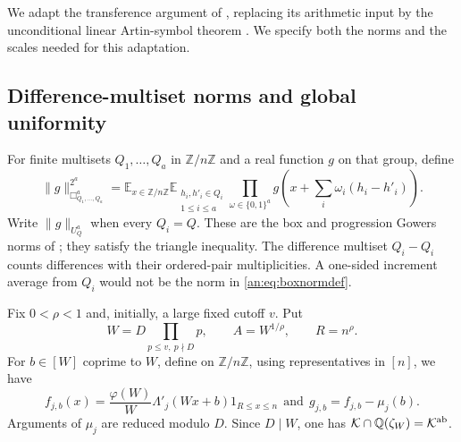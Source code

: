 \documentclass[11pt,reqno]{amsart}
\theoremstyle{definition}
\numberwithin{equation}{section}
\newcommand{\Lam}{\Lambda'}
\newcommand{\Q}{\mathbb Q}
\newcommand{\Z}{\mathbb Z}
\def\t{\text}
\begin{document}
We adapt the transference argument of \cite{TZpoly}, replacing its arithmetic input by the unconditional linear Artin-symbol theorem \cite[Theorem 1.4]{FT}. We specify both the norms and the scales needed for this adaptation.

\subsection{Difference-multiset norms and global uniformity}
For finite multisets $Q_1,\ldots,Q_a$ in $\Z/n\Z$ and a real function $g$ on that group, define
\begin{equation}\label{an:eq:boxnormdef}
 \|g\|_{\Box^a_{Q_1,\ldots,Q_a}}^{2^a}
 =\mathbb E_{x\in\Z/n\Z}
   \mathbb E_{\substack{h_i,h'_i\in Q_i\\1\le i\le a}}
   \prod_{\omega\in\{0,1\}^a}
       g\left(x+\sum_i\omega_i(h_i-h'_i)\right).
\end{equation}
Write $\|g\|_{U^a_Q}$ when every $Q_i=Q$. These are the box and progression Gowers norms of \cite[Section 1.8]{TZpoly}; they satisfy the triangle inequality. The difference multiset $Q_i-Q_i$ counts differences with their ordered-pair multiplicities. A one-sided increment average from $Q_i$ would not be the norm in \eqref{an:eq:boxnormdef}.

Fix $0<\rho<1$ and, initially, a large fixed cutoff $v$. Put
\begin{equation}\label{an:eq:analyticW}
 W=D\prod_{p\le v,\ p\nmid D}p,\qquad A=W^{1/\rho},\qquad R=n^\rho.
\end{equation}
For $b\in[W]$ coprime to $W$, define on $\Z/n\Z$, using representatives in $[n]$, we have
\begin{equation}\label{an:eq:modifiedweight}
 f_{j,b}(x)=\frac{\varphi(W)}W\Lam_j(Wx+b)1_{R\le x\le n}\ \ \t{and}\ \ g_{j,b}=f_{j,b}-\mu_j(b).
\end{equation}
Arguments of $\mu_j$ are reduced modulo $D$. Since $D\mid W$, one has $\mathcal K\cap\Q(\zeta_W)=\mathcal K^{\rm ab}$.
\end{document}
